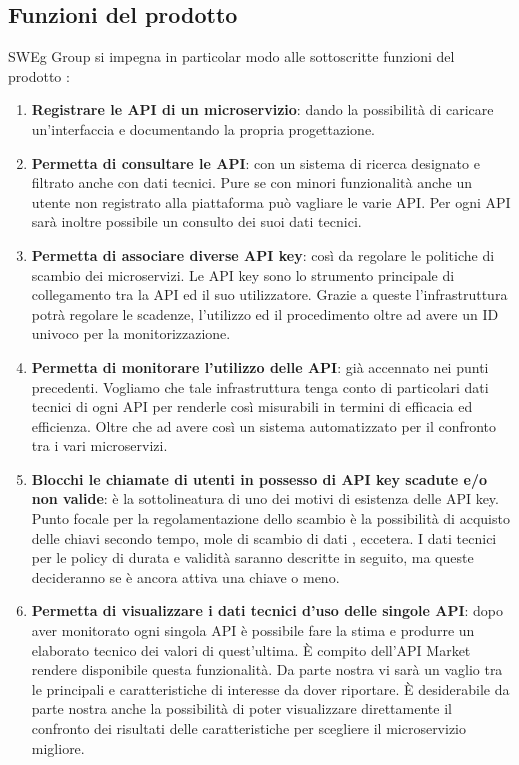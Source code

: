 \documentclass[12pt,a4paper,titlepage]{article}
\begin{document}
	\subsection{Funzioni del prodotto}
	SWEg Group si impegna in particolar modo alle sottoscritte funzioni del prodotto :
	\begin{enumerate}
		\item \textbf{Registrare le API di un microservizio}:	dando la possibilità di caricare un'interfaccia e documentando la propria progettazione.
		\item \textbf{Permetta di consultare le API}:	con un sistema di ricerca designato e filtrato anche con dati tecnici. Pure se con minori funzionalità anche un utente non registrato alla piattaforma può vagliare le varie API. Per ogni API sarà inoltre possibile un consulto dei suoi dati tecnici.
		\item \textbf{Permetta di associare diverse API key}: così da regolare le politiche di scambio dei microservizi. Le API key sono lo strumento principale di collegamento tra la API ed il suo utilizzatore. Grazie a queste l'infrastruttura potrà regolare le scadenze, l'utilizzo ed il procedimento oltre ad avere un ID univoco per la monitorizzazione. 
		\item \textbf{Permetta di monitorare l'utilizzo delle API}:	già accennato nei punti precedenti. Vogliamo che tale infrastruttura tenga conto di particolari dati tecnici di ogni API per renderle così misurabili in termini di efficacia ed efficienza. Oltre che ad avere così un sistema automatizzato per il confronto tra i vari microservizi.
		\item \textbf{Blocchi le chiamate di utenti in possesso di API key scadute e/o non valide}:	è la sottolineatura di uno dei motivi di esistenza delle API key. Punto focale per la regolamentazione dello scambio è la possibilità di acquisto delle chiavi secondo tempo, mole di scambio di dati , eccetera. I dati tecnici per le policy di durata e validità saranno descritte in seguito, ma queste decideranno se è ancora attiva una chiave o meno.
		\item \textbf{Permetta di visualizzare i dati tecnici d'uso delle singole API}:	dopo aver monitorato ogni singola API è possibile fare la stima e produrre un elaborato tecnico dei valori di quest'ultima. È compito dell'API Market rendere disponibile questa funzionalità. Da parte nostra vi sarà un vaglio tra le principali e caratteristiche di interesse da dover riportare. È desiderabile da parte nostra anche la possibilità di poter visualizzare direttamente il confronto dei risultati delle caratteristiche per scegliere il microservizio migliore.

\end{enumerate}
\end{document}
